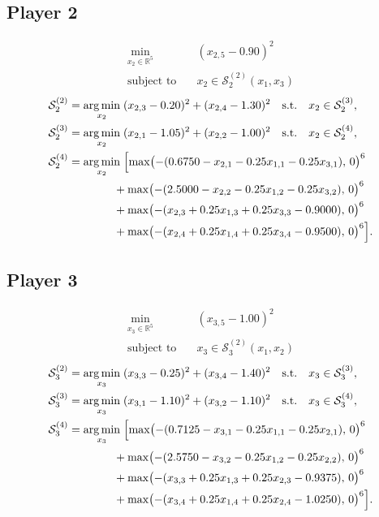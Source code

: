 \documentclass[11pt]{article}
\newcommand{\argmin}{\operatorname*{arg\,min}}
\begin{document}
\subsection*{Player 2}
\[
\begin{aligned}
  \min_{x_2 \in \mathbb{R}^5} \quad & (x_{2,5}-0.90)^2 \\
  \text{subject to} \quad & x_2 \in \mathcal{S}_2^{(2)}(x_1,x_3)
\end{aligned}
\]
\[
\begin{aligned}
  \mathcal{S}_2^{(2)} &= \argmin_{x_2} \;
    (x_{2,3}-0.20)^2 + (x_{2,4}-1.30)^2
    \quad \text{s.t.} \quad x_2 \in \mathcal{S}_2^{(3)}, \\
  \mathcal{S}_2^{(3)} &= \argmin_{x_2} \;
    (x_{2,1}-1.05)^2 + (x_{2,2}-1.00)^2
    \quad \text{s.t.} \quad x_2 \in \mathcal{S}_2^{(4)}, \\
  \mathcal{S}_2^{(4)} &= \argmin_{x_2} \;
    \Bigl[ \max\bigl(-(0.6750 - x_{2,1} - 0.25x_{1,1} - 0.25x_{3,1}),\,0\bigr)^6 \\
    &\qquad\qquad + \max\bigl(-(2.5000 - x_{2,2} - 0.25x_{1,2} - 0.25x_{3,2}),\,0\bigr)^6 \\
    &\qquad\qquad + \max\bigl(-(x_{2,3} + 0.25x_{1,3} + 0.25x_{3,3} - 0.9000),\,0\bigr)^6 \\
    &\qquad\qquad + \max\bigl(-(x_{2,4} + 0.25x_{1,4} + 0.25x_{3,4} - 0.9500),\,0\bigr)^6 \Bigr].
\end{aligned}
\]

\subsection*{Player 3}
\[
\begin{aligned}
  \min_{x_3 \in \mathbb{R}^5} \quad & (x_{3,5}-1.00)^2 \\
  \text{subject to} \quad & x_3 \in \mathcal{S}_3^{(2)}(x_1,x_2)
\end{aligned}
\]
\[
\begin{aligned}
  \mathcal{S}_3^{(2)} &= \argmin_{x_3} \;
    (x_{3,3}-0.25)^2 + (x_{3,4}-1.40)^2
    \quad \text{s.t.} \quad x_3 \in \mathcal{S}_3^{(3)}, \\
  \mathcal{S}_3^{(3)} &= \argmin_{x_3} \;
    (x_{3,1}-1.10)^2 + (x_{3,2}-1.10)^2
    \quad \text{s.t.} \quad x_3 \in \mathcal{S}_3^{(4)}, \\
  \mathcal{S}_3^{(4)} &= \argmin_{x_3} \;
    \Bigl[ \max\bigl(-(0.7125 - x_{3,1} - 0.25x_{1,1} - 0.25x_{2,1}),\,0\bigr)^6 \\
    &\qquad\qquad + \max\bigl(-(2.5750 - x_{3,2} - 0.25x_{1,2} - 0.25x_{2,2}),\,0\bigr)^6 \\
    &\qquad\qquad + \max\bigl(-(x_{3,3} + 0.25x_{1,3} + 0.25x_{2,3} - 0.9375),\,0\bigr)^6 \\
    &\qquad\qquad + \max\bigl(-(x_{3,4} + 0.25x_{1,4} + 0.25x_{2,4} - 1.0250),\,0\bigr)^6 \Bigr].
\end{aligned}
\]
\end{document}
